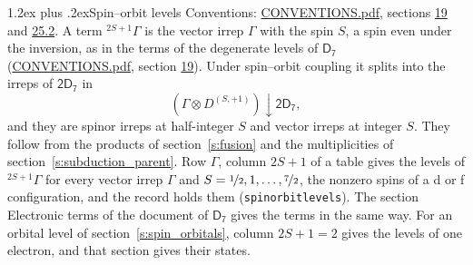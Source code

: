 \documentclass[10pt,a4paper]{article}
\makeatletter
\renewcommand\section{\@startsection{section}{1}{\z@}{-3ex plus -1ex minus -.2ex}%
  {1.2ex plus .2ex}{\normalfont\large\sffamily\bfseries\color{parttitle}}}
\numberwithin{equation}{section}
\newcommand{\grp}[1]{\mathsf{#1}}
\newcommand{\restr}[2]{#1\!\downarrow#2}
\newcommand{\irrJp}[2]{D^{(#1,#2)}}
\newcommand{\irrprod}{\otimes}
\newcommand{\term}[2]{{}^{#1}#2}
\makeatother
\begin{document}
\section{Spin--orbit levels}\label{s:spin_orbit}
Conventions: \href{../../CONVENTIONS.pdf}{CONVENTIONS.pdf}, sections \href{../../../rotation/CONVENTIONS.pdf\#conv.19}{19} and \href{../../CONVENTIONS.pdf\#conv.25.2}{25.2}.
\leavevmode\label{n:local.spin}\label{n:symbol.term}A term $\term{2S+1}{\Gamma}$ is the vector irrep $\Gamma$ with the spin $S$, a spin even under the inversion, as in the terms of the degenerate levels of \href{../../../rotation/data/pdf/D7.pdf}{$\grp{D_{7}}$} (\href{../../CONVENTIONS.pdf}{CONVENTIONS.pdf}, section \href{../../../rotation/CONVENTIONS.pdf\#conv.19}{19}). Under spin--orbit coupling it splits into the irreps of $\grp{2D_{7}}$ in
\begin{equation}\label{e:spinorbit}\restr{(\Gamma \irrprod \irrJp{S}{+1})}{\grp{2D_{7}}},\end{equation}
and they are spinor irreps at half-integer $S$ and vector irreps at integer $S$. They follow from the products of section~\ref{s:fusion} and the multiplicities of section~\ref{s:subduction_parent}. Row $\Gamma$, column $2S + 1$ of a table gives the levels of $\term{2S+1}{\Gamma}$ for every vector irrep $\Gamma$ and $S = \nicefrac{1}{2}, 1, \dots, \nicefrac{7}{2}$, the nonzero spins of a d or f configuration, and the record holds them (\texttt{spinorbitlevels}). The section Electronic terms of the document of \href{../../../rotation/data/pdf/D7.pdf}{$\grp{D_{7}}$} gives the terms in the same way. For an orbital level of section~\ref{s:spin_orbitals}, column $2S + 1 = 2$ gives the levels of one electron, and that section gives their states.
\end{document}

